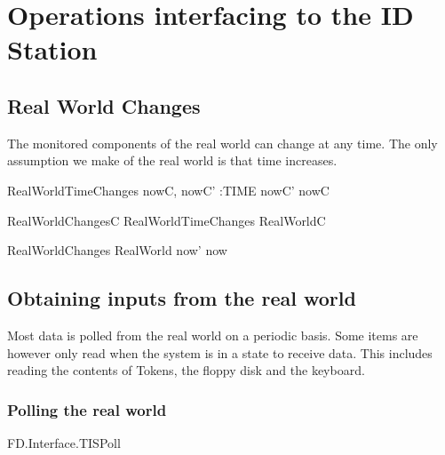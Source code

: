 
\chapter{Operations interfacing to the ID Station}
\label{sec:Interfaces}

\section{Real World Changes}
The monitored components of the real world can change at any time.
The only assumption we make of the real world is that time increases.

\begin{schema}{RealWorldTimeChanges}
        nowC, nowC' :TIME
\where
        nowC' \geq nowC
\end{schema}

\begin{zed}
        RealWorldChangesC  RealWorldTimeChanges \land \Delta RealWorldC
\end{zed}

\begin{schema}{RealWorldChanges}
        \Delta RealWorld
\where
        now' \geq now
\end{schema}

\section{Obtaining inputs from the real world}

Most data is polled from the real world on a periodic basis. 
Some items are however only read when the system is in a state to
receive data. This includes reading the contents of Tokens, the floppy
disk and the keyboard.


\subsection{Polling the real world}

\begin{traceunit}{FD.Interface.TISPoll}
\end{traceunit}


